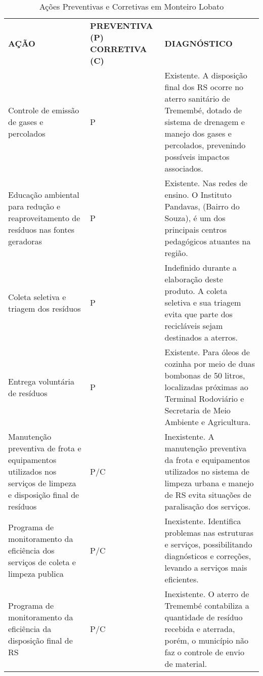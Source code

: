 \begin{table}[htbp]
	\centering
	\caption{Ações Preventivas e Corretivas em Monteiro Lobato}
	\begin{tabular}{|P{15em}|P{7em}|P{22em}|}
		 \textcolor[rgb]{ 1,  1,  1}{\textbf{AÇÃO}} & \textcolor[rgb]{ 1,  1,  1}{\textbf{PREVENTIVA (P) CORRETIVA (C)}} & \textcolor[rgb]{ 1,  1,  1}{\textbf{DIAGNÓSTICO}} \\
		 Controle de emissão de gases e percolados & P     & Existente. A disposição final dos RS ocorre no aterro sanitário de Tremembé, dotado de sistema de drenagem e manejo dos gases e percolados, prevenindo possíveis impactos associados. \\
		 Educação ambiental para redução e reaproveitamento de resíduos nas fontes geradoras & P     & Existente. Nas redes de ensino. O Instituto Pandavas, (Bairro do Souza), é um dos principais centros pedagógicos atuantes na região. \\
		 Coleta seletiva e triagem dos resíduos & P     & Indefinido durante a elaboração deste produto. A coleta seletiva e sua triagem evita que parte dos recicláveis sejam destinados a aterros. \\
		 Entrega voluntária de resíduos & P     & Existente. Para óleos de cozinha por meio de duas bombonas de 50 litros, localizadas próximas ao Terminal Rodoviário e Secretaria de Meio Ambiente e Agricultura. \\
		 Manutenção preventiva de frota e equipamentos utilizados nos serviços de limpeza e disposição final de resíduos & P/C & Inexistente. A manutenção preventiva da frota e equipamentos utilizados no sistema de limpeza urbana e manejo de RS evita situações de paralisação dos serviços. \\
		 Programa de monitoramento da eficiência dos serviços de coleta e limpeza publica & P/C   & Inexistente. Identifica problemas nas estruturas e serviços, possibilitando diagnósticos e correções, levando a serviços mais eficientes. \\
		 Programa de monitoramento da eficiência da disposição final de RS & P/C   & Inexistente. O aterro de Tremembé contabiliza a quantidade de resíduo recebida e aterrada, porém, o município não faz o controle de envio de material. \\

\end{tabular}
\end{table}
